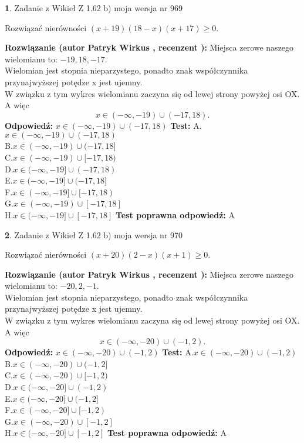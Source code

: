 \documentclass[12pt, a4paper]{article}
\theoremstyle{definition} %
\newtheorem{zad}{}
\newcommand{\zadStart}[1]{\begin{zad}#1\newline}
\newcommand{\zadStop}{\end{zad}}
\newcommand{\rozwStart}[2]{\noindent \textbf{Rozwiązanie (autor #1 , recenzent #2): }\newline}
\newcommand{\rozwStop}{\newline}
\newcommand{\odpStart}{\noindent \textbf{Odpowiedź:}\newline}
\newcommand{\odpStop}{\newline}
\newcommand{\testStart}{\noindent \textbf{Test:}\newline}
\newcommand{\testStop}{\newline}
\newcommand{\kluczStart}{\noindent \textbf{Test poprawna odpowiedź:}\newline}
\newcommand{\kluczStop}{\newline}
\begin{document}
\zadStart{Zadanie z Wikieł Z 1.62 b) moja wersja nr 969}

Rozwiązać nierówności $(x+19)(18-x)(x+17)\ge0$.
\zadStop
\rozwStart{Patryk Wirkus}{}
Miejsca zerowe naszego wielomianu to: $-19, 18, -17$.\\
Wielomian jest stopnia nieparzystego, ponadto znak współczynnika przy\linebreak najwyższej potędze x jest ujemny.\\ W związku z tym wykres wielomianu zaczyna się od lewej strony powyżej osi OX. A więc $$x \in (-\infty,-19) \cup (-17,18).$$
\rozwStop
\odpStart
$x \in (-\infty,-19) \cup (-17,18)$
\odpStop
\testStart
A.$x \in (-\infty,-19) \cup (-17,18)$\\
B.$x \in (-\infty,-19) \cup (-17,18]$\\
C.$x \in (-\infty,-19) \cup [-17,18)$\\
D.$x \in (-\infty,-19] \cup (-17,18)$\\
E.$x \in (-\infty,-19] \cup (-17,18]$\\
F.$x \in (-\infty,-19] \cup [-17,18)$\\
G.$x \in (-\infty,-19) \cup [-17,18]$\\
H.$x \in (-\infty,-19] \cup [-17,18]$
\testStop
\kluczStart
A
\kluczStop



\zadStart{Zadanie z Wikieł Z 1.62 b) moja wersja nr 970}

Rozwiązać nierówności $(x+20)(2-x)(x+1)\ge0$.
\zadStop
\rozwStart{Patryk Wirkus}{}
Miejsca zerowe naszego wielomianu to: $-20, 2, -1$.\\
Wielomian jest stopnia nieparzystego, ponadto znak współczynnika przy\linebreak najwyższej potędze x jest ujemny.\\ W związku z tym wykres wielomianu zaczyna się od lewej strony powyżej osi OX. A więc $$x \in (-\infty,-20) \cup (-1,2).$$
\rozwStop
\odpStart
$x \in (-\infty,-20) \cup (-1,2)$
\odpStop
\testStart
A.$x \in (-\infty,-20) \cup (-1,2)$\\
B.$x \in (-\infty,-20) \cup (-1,2]$\\
C.$x \in (-\infty,-20) \cup [-1,2)$\\
D.$x \in (-\infty,-20] \cup (-1,2)$\\
E.$x \in (-\infty,-20] \cup (-1,2]$\\
F.$x \in (-\infty,-20] \cup [-1,2)$\\
G.$x \in (-\infty,-20) \cup [-1,2]$\\
H.$x \in (-\infty,-20] \cup [-1,2]$
\testStop
\kluczStart
A
\kluczStop
\end{document}
